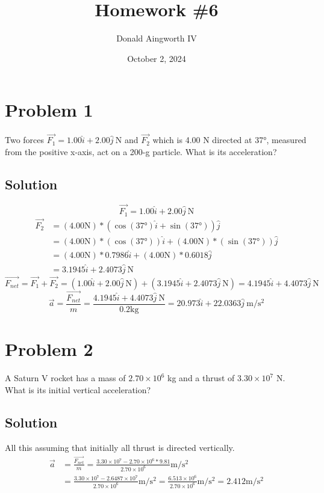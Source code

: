 \documentclass[12pt]{article}
\title{Homework \#6}
\author{Donald Aingworth IV}
\date{October 2, 2024}
\begin{document}

\maketitle

\section*{Problem 1}
Two forces $\vec{F_1} = 1.00 \hat{i} + 2.00 \hat{j}\ \unit{\newton}$ and $\vec{F_2}$ which is 4.00 N directed at 37$\unit{\degree}$, measured from the positive x-axis, act on a 200-g particle. What is its acceleration?

\subsection*{Solution}
\[ \vec{F_1} = 1.00 \hat{i} + 2.00 \hat{j}\ \unit{\newton} \]
\begin{align*}
    \vec{F_2} &= (4.00\unit{\newton})*(\cos(37\unit{\degree})\hat{i} + \sin(37\unit{\degree}))\hat{j} \\
            &= (4.00\unit{\newton})*(\cos(37\unit{\degree}))\hat{i} + (4.00\unit{\newton})*(\sin(37\unit{\degree}))\hat{j}\\
            &= (4.00\unit{\newton})*0.7986\hat{i} + (4.00\unit{\newton})*0.6018\hat{j}\\
            &= 3.1945\hat{i} + 2.4073\hat{j}\ \unit{\newton}
\end{align*}
\[ 
    \vec{F_{net}} = \vec{F_1} + \vec{F_2} 
                = (1.00 \hat{i} + 2.00 \hat{j}\ \unit{\newton}) + (3.1945\hat{i} + 2.4073\hat{j}\ \unit{\newton}) 
                = 4.1945\hat{i} + 4.4073\hat{j}\ \unit{\newton} 
\]
\[ 
    \vec{a} = \frac{\vec{F_{net}}}{m} 
        = \frac{4.1945\hat{i} + 4.4073\hat{j}\ \unit{\newton}}{0.2 \unit{\kilo\gram}} 
        = \boxed{ 20.973\hat{i} + 22.0363\hat{j}\ \unit{\meter/\second^2} } 
\]

\pagebreak
\section*{Problem 2}
A Saturn V rocket has a mass of $2.70 \times 10^6$ kg and a thrust of $3.30 \times 10^7$ N. What is its initial vertical
acceleration?

\subsection*{Solution}
All this assuming that initially all thrust is directed vertically.
\begin{align*}
    \vec{a} &= \frac{\vec{F_{net}}}{m} 
        = \frac{3.30 \times 10^7 - 2.70 \times 10^6 * 9.81}{2.70 \times 10^6} \unit{\meter/\second^2}\\
        &= \frac{3.30 \times 10^7 - 2.6487 \times 10^7}{2.70 \times 10^6} \unit{\meter/\second^2}
        = \frac{6.513 \times 10^6}{2.70 \times 10^6} \unit{\meter/\second^2}
        = \boxed{2.412 \unit{\meter/\second^2}}
\end{align*}
\end{document}

